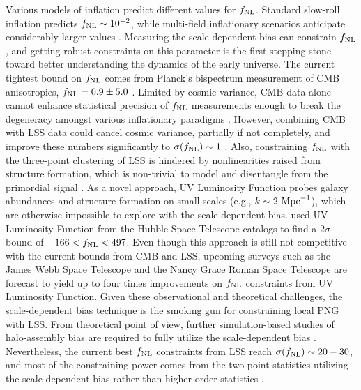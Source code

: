 Various models of inflation predict different values for $f_{\rm NL}$. Standard slow-roll inflation predicts $f_{\rm NL} \sim 10^{-2}$, while multi-field inflationary scenarios anticipate considerably larger values \citep[see, e.g.,][]{alvarez2014arXiv1412.4671A, de2017next}. Measuring the scale dependent bias can constrain $f_{\rm NL}$, and getting robust constraints on this parameter is the first stepping stone toward better understanding the dynamics of the early universe. The current tightest bound on $f_{\rm NL}$ comes from Planck's bispectrum measurement of CMB anisotropies, $f_{\rm NL}=0.9\pm 5.0$ \citep{akrami2019planck}. Limited by cosmic variance, CMB data alone cannot enhance statistical precision of $f_{\rm NL}$ measurements enough to break the degeneracy amongst various inflationary paradigms \citep[see, e.g.,][]{ade2019simons}. However, combining CMB with LSS data could cancel cosmic variance, partially if not completely, and improve these numbers significantly to $\sigma(f_{\rm NL}) \sim 1$ \citep[see, e.g.,][]{schmittfull2018PhRvD}. Also, constraining $f_{\rm NL}$ with the three-point clustering of LSS is hindered by nonlinearities raised from structure formation, which is non-trivial to model and disentangle from the primordial signal \citep{baldauf2011galaxy, baldauf2011primordial}. As a novel approach, UV Luminosity Function probes galaxy abundances and structure formation on small scales (e.g., $k \sim 2~{\rm Mpc}^{-1}$), which are otherwise impossible to explore with the scale-dependent bias. \cite{sabti2021JCAP} used UV Luminosity Function from the Hubble Space Telescope catalogs \citep{bouwens2015ApJ} to find a $2\sigma$ bound of $-166<f_{\rm NL}<497$. Even though this approach is still not competitive with the current bounds from CMB and LSS, upcoming surveys such as the James Webb Space Telescope and the Nancy Grace Roman Space Telescope are forecast to yield up to four times improvements on $
f_{\rm NL}$ constraints from UV Luminosity Function. Given these observational and theoretical challenges, the scale-dependent bias technique is the smoking gun for constraining local PNG with LSS. From theoretical point of view, further simulation-based studies of halo-assembly bias are required to fully utilize the scale-dependent bias \citep{2020JCAP...12..013B, 2020JCAP...12..031B, 2022JCAP...11..013B, 2023JCAP...01..023L}. Nevertheless, the current best $f_{\rm NL}$ constraints from LSS reach $\sigma(f_{\rm NL}) \sim 20-30$, and most of the constraining power comes from the two point statistics utilizing the scale-dependent bias rather than higher order statistics \citep{2019JCAP...09..010C, mueller2022primordial, 2022PhRvD.106d3506C, 2022arXiv220111518D}.

